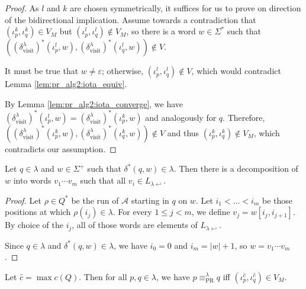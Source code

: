 \begin{proof}
	As $l$ and $k$ are chosen symmetrically, it suffices for us to prove on direction of the bidirectional implication. Assume towards a contradiction that $(\iota_p^k, \iota_q^k) \in V_M$ but $(\iota_p^l, \iota_q^l) \notin V_M$, so there is a word $w \in \Sigma^*$ such that $((\delta^\lambda_\text{visit})^*(\iota_p^l, w), (\delta^\lambda_\text{visit})^*(\iota_q^l, w)) \notin V$.
	
	It must be true that $w \neq \varepsilon$; otherwise, $(\iota_p^l, \iota_q^l) \notin V$, which would contradict Lemma \ref{lem:pr_alg2:iota_equiv}.
	
	By Lemma \ref{lem:pr_alg2:iota_converge}, we have $(\delta^\lambda_\text{visit})^*(\iota_p^l, w) = (\delta^\lambda_\text{visit})^*(\iota_p^k, w)$ and analogously for $q$. Therefore, $((\delta^\lambda_\text{visit})^*(\iota_p^k, w), (\delta^\lambda_\text{visit})^*(\iota_q^k, w)) \notin V$ and thus $(\iota_p^k, \iota_q^k) \notin V_M$, which contradicts our assumption.
\end{proof}

\begin{lem}
	Let $q \in \lambda$ and $w \in \Sigma^+$ such that $\delta^*(q, w) \in \lambda$. Then there is a decomposition of $w$ into words $v_1 \cdots v_m$ such that all $v_i \in L_{\lambda \hookleftarrow}$.
	\label{lem:pr_alg2:decompose_lambdahook}
\end{lem}

\begin{proof}
	Let $\rho \in Q^*$ be the run of $\mathcal{A}$ starting in $q$ on $w$. Let $i_1 < \dots < i_m$ be those positions at which $\rho(i_j) \in \lambda$. For every $1 \leq j < m$, we define $v_j = w[i_j, i_{j+1}]$. By choice of the $i_j$, all of those words are elements of $L_{\lambda \hookleftarrow}$.
	
	Since $q \in \lambda$ and $\delta^*(q, w) \in \lambda$, we have $i_0 = 0$ and $i_m = |w| + 1$, so $w = v_1 \cdots v_m$.  
\end{proof}

\begin{theorem}
	Let $\hat{c} = \max c(Q)$. Then for all $p, q \in \lambda$, we have $p \equiv_\text{PR}^\lambda q$ iff $(\iota_p^{\hat{c}}, \iota_q^{\hat{c}}) \in V_M$.
\end{theorem}

